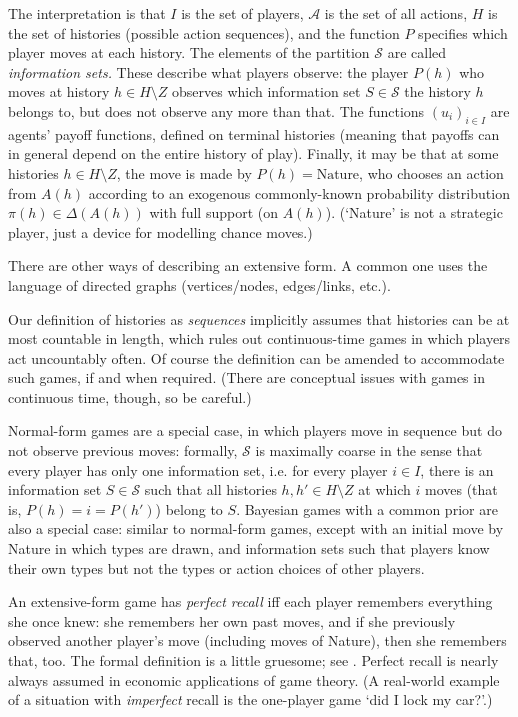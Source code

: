 \documentclass[11pt,letterpaper,reqno,oneside]{book}
\begin{document}
The interpretation is that $I$ is the set of players, $\mathcal{A}$ is the set of all actions, $H$ is the set of histories (possible action sequences), and the function $P$ specifies which player moves at each history. The elements of the partition $\mathcal{S}$ are called \emph{information sets.} These describe what players observe: the player $P(h)$ who moves at history $h \in H \setminus Z$ observes which information set $S \in \mathcal{S}$ the history $h$ belongs to, but does not observe any more than that. The functions $(u_i)_{i \in I}$ are agents' payoff functions, defined on terminal histories (meaning that payoffs can in general depend on the entire history of play). Finally, it may be that at some histories $h \in H \setminus Z$, the move is made by $P(h) = \text{Nature}$, who chooses an action from $A(h)$ according to an exogenous commonly-known probability distribution $\pi(h) \in \Delta(A(h))$ with full support (on $A(h)$). (`Nature' is not a strategic player, just a device for modelling chance moves.)

There are other ways of describing an extensive form. A common one uses the language of directed graphs (vertices/nodes, edges/links, etc.). 

\begin{remark}[technical]
	\label{remark:conts_time}
	Our definition of histories as \emph{sequences} implicitly assumes that histories can be at most countable in length, which rules out continuous-time games in which players act uncountably often. Of course the definition can be amended to accommodate such games, if and when required. (There are conceptual issues with games in continuous time, though, so be careful.)
\end{remark}

Normal-form games are a special case, in which players move in sequence but do not observe previous moves: formally, $\mathcal{S}$ is maximally coarse in the sense that every player has only one information set, i.e. for every player $i \in I$, there is an information set $S \in \mathcal{S}$ such that all
histories $h,h' \in H \setminus Z$ at which $i$ moves (that is, $P(h)=i=P(h')$) belong to $S$. Bayesian games with a common prior are also a special case: similar to normal-form games, except with an initial move by Nature in which types are drawn, and information sets such that players know their own types but not the types or action choices of other players.

An extensive-form game has \emph{perfect recall} iff each player remembers everything she once knew: she remembers her own past moves, and if she previously observed another player's move (including moves of Nature), then she remembers that, too. The formal definition is a little gruesome; see \textcite[][section~11.1.3]{OsborneRubinstein1994}. Perfect recall is nearly always assumed in economic applications of game theory. (A real-world example of a situation with \emph{imperfect} recall is the one-player game `did I lock my car?'.)
\end{document}

